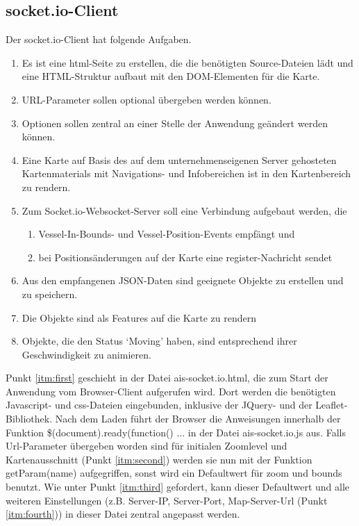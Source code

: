 \subsection{socket.io-Client}\label{socket.io-Client}
Der socket.io-Client hat folgende Aufgaben.
\begin{enumerate}
\item \label{itm:first} Es ist eine html-Seite zu erstellen, die die benötigten Source-Dateien lädt und eine HTML-Struktur aufbaut mit den DOM-Elementen für die Karte.
\item  \label{itm:second}URL-Parameter sollen optional übergeben werden können.
\item  \label{itm:third}Optionen sollen zentral an einer Stelle der Anwendung geändert werden können.
\item  \label{itm:fourth} Eine Karte auf Basis des auf dem unternehmenseigenen Server gehosteten Kartenmaterials mit Navigations- und Infobereichen ist in den Kartenbereich zu rendern.
\item  \label{itm:fifth} Zum Socket.io-Websocket-Server soll eine Verbindung aufgebaut werden, die
\begin{enumerate}
\item  \label{itm:fifthA}Vessel-In-Bounds- und Vessel-Position-Events empfängt und
\item \label{itm:fifthB}bei Positionsänderungen auf der Karte eine register-Nachricht sendet
\end{enumerate}
\item \label{itm:sixth} Aus den empfangenen JSON-Daten sind geeignete Objekte zu erstellen und zu speichern.
\item \label{itm:seventh}Die Objekte sind als Features auf die Karte zu rendern
\item \label{itm:eighth} Objekte, die den Status ‘Moving’ haben, sind entsprechend ihrer Geschwindigkeit zu animieren.
\end{enumerate}
Punkt \ref{itm:first} geschieht in der Datei ais-socket.io.html, die zum Start der Anwendung vom Browser-Client aufgerufen wird. Dort werden die benötigten Javascript- und css-Dateien eingebunden, inklusive der JQuery- und der Leaflet-Bibliothek. Nach dem Laden führt der Browser die Anweisungen innerhalb der Funktion \$(document).ready(function() {...} in der Datei ais-socket.io.js aus. Falls Url-Parameter übergeben worden sind für initialen Zoomlevel und Kartenausschnitt (Punkt \ref{itm:second}) werden sie nun mit der Funktion getParam(name) aufgegriffen, sonst wird ein Defaultwert für zoom und bounds benutzt. Wie unter Punkt \ref{itm:third} gefordert, kann dieser Defaultwert und alle weiteren Einstellungen (z.B. Server-IP, Server-Port, Map-Server-Url (Punkt \ref{itm:fourth})) in dieser Datei zentral angepasst werden.
